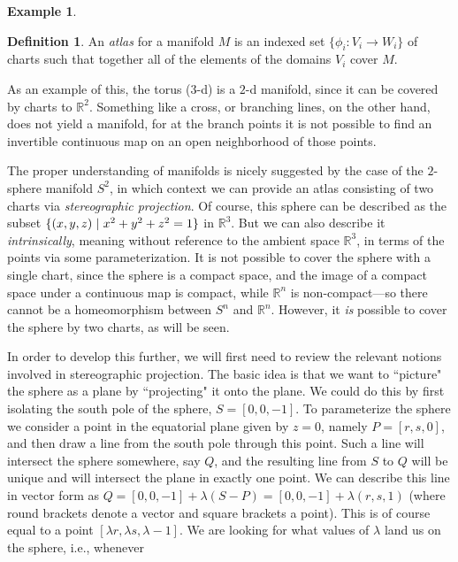 \documentclass[a4paper]{book}
\theoremstyle{definition}
\newtheorem{example}{Example}[section]
\theoremstyle{definition}
\newtheorem{definition}{Definition}[section]
\theoremstyle{definition}
\theoremstyle{theorem}
\theoremstyle{definition}
\begin{document}
\begin{example}
	\begin{definition}
		An \textit{atlas} for a manifold $M$ is an indexed set $\{\phi_i: V_i \rightarrow W_i \}$ of charts such that together all of the elements of the domains $V_i$ cover $M$. 
	\end{definition} \noindent 
	As an example of this, the torus ($3$-d) is a $2$-d manifold, since it can be covered by charts to $\mathbb{R}^2$. Something like a cross, or branching lines, on the other hand, does not yield a manifold, for at the branch points it is not possible to find an invertible continuous map on an open neighborhood of those points. \par 
	The proper understanding of manifolds is nicely suggested by the case of the $2$-sphere manifold $S^2$, in which context we can provide an atlas consisting of two charts via \textit{stereographic projection}. Of course, this sphere can be described as the subset $\{(x,y,z) \hspace*{0.3em}| \hspace*{0.3em} x^2 + y^2 +z^2 = 1\}$ in $\mathbb{R}^3$. But we can also describe it \textit{intrinsically}, meaning without reference to the ambient space $\mathbb{R}^3$,  in terms of the points via some parameterization. It is not possible to cover the sphere with a single chart, since the sphere is a compact space, and the image of a compact space under a continuous map is compact, while $\mathbb{R}^n$ is non-compact---so there cannot be a homeomorphism between $S^n$ and $\mathbb{R}^n$. However, it \textit{is} possible to cover the sphere by two charts, as will be seen.\par 
	In order to develop this further, we will first need to review the relevant notions involved in stereographic projection. The basic idea is that we want to ``picture" the sphere as a plane by ``projecting" it onto the plane. We could do this by first isolating the south pole of the sphere, $S = [0,0,-1]$. To parameterize the sphere we consider a point in the equatorial plane given by $z=0$, namely $P = [r,s,0]$, and then draw a line from the south pole through this point. Such a line will intersect the sphere somewhere, say $Q$, and the resulting line from $S$ to $Q$ will be unique and will intersect the plane in exactly one point. We can describe this line in vector form as $ Q = [0,0,-1] + \lambda (S-P) = [0,0,-1] + \lambda(r,s,1)$ (where round brackets denote a vector and square brackets a point). This is of course equal to a point $[\lambda r, \lambda s, \lambda - 1]$. We are looking for what values of $\lambda$ land us on the sphere, i.e., whenever 

\end{example}
\end{document}
